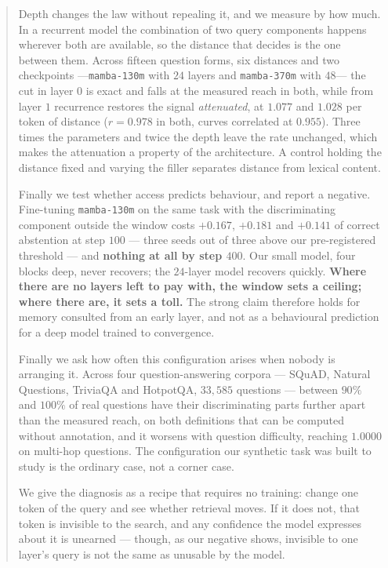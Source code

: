 \documentclass[11pt,a4paper]{article}
\begin{document}
\begin{abstract}
Depth changes the law without repealing it, and we measure by how much. In a recurrent model the
combination of two query components happens wherever both are available, so the distance that decides
is the one between them. Across fifteen question forms, six distances and two checkpoints
---\texttt{mamba-130m} with $24$ layers and \texttt{mamba-370m} with $48$--- the cut in layer $0$ is
exact and falls at the measured reach in both, while from layer $1$ recurrence restores the signal
\emph{attenuated}, at $1.077$ and $1.028$ per token of distance ($r = 0.978$ in both, curves
correlated at $0.955$). Three times the parameters and twice the depth leave the rate unchanged, which
makes the attenuation a property of the architecture. A control holding the distance fixed and varying
the filler separates distance from lexical content.

Finally we test whether access predicts behaviour, and report a negative. Fine-tuning
\texttt{mamba-130m} on the same task with the discriminating component outside the window costs
$+0.167$, $+0.181$ and $+0.141$ of correct abstention at step $100$ --- three seeds out of three above
our pre-registered threshold --- and \textbf{nothing at all by step $400$}. Our small model, four
blocks deep, never recovers; the $24$-layer model recovers quickly. \textbf{Where there are no layers
left to pay with, the window sets a ceiling; where there are, it sets a toll.} The strong claim
therefore holds for memory consulted from an early layer, and not as a behavioural prediction for a
deep model trained to convergence.

Finally we ask how often this configuration arises when nobody is arranging it. Across four
question-answering corpora --- SQuAD, Natural Questions, TriviaQA and HotpotQA, $33{,}585$ questions ---
between $90\%$ and $100\%$ of real questions have their discriminating parts further apart than the
measured reach, on both definitions that can be computed without annotation, and it worsens with
question difficulty, reaching $\mathbf{1.0000}$ on multi-hop questions. The configuration our synthetic task was built to study is the ordinary case, not a corner
case.

We give the diagnosis as a recipe that requires no training: change one token of the query and see
whether retrieval moves. If it does not, that token is invisible to the search, and any confidence the
model expresses about it is unearned --- though, as our negative shows, invisible to one layer's query
is not the same as unusable by the model.
\end{abstract}
\end{document}
